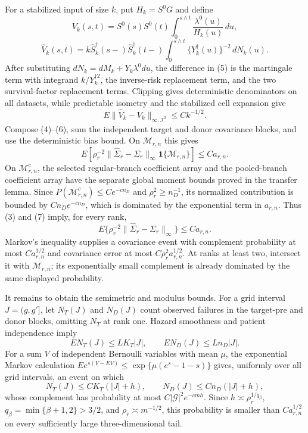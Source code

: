 For a stabilized input of size \(k\), put \(H_k=S^0G\) and define
\[
 V_k(s,t)=S^0(s)S^0(t)\int_0^{s\wedge t}
 \frac{\lambda^0(u)}{H_k(u)}\,du,
\]
\[
 \widehat V_k(s,t)=k\widehat S_k^\dagger(s-)
 \widehat S_k^\dagger(t-)
 \int_0^{s\wedge t}\{Y_k^\dagger(u)\}^{-2}\,dN_k(u). \tag{5}
\]
After substituting \(dN_k=dM_k+Y_k\lambda^0du\), the difference in (5) is
the martingale term with integrand \(k/Y_k^{\dagger2}\), the inverse-risk
replacement term, and the two survival-factor replacement terms.  Clipping
gives deterministic denominators on all datasets, while predictable isometry
and the stabilized cell expansion give
\[
 E\|\widehat V_k-V_k\|_{\infty,\mathcal I^2}
 \le Ck^{-1/2}.                                         \tag{6}
\]
Compose (4)--(6), sum the independent target and donor covariance blocks, and
use the deterministic bias bound.  On \(\mathcal M_{r,n}\) this gives
\[
 E\left[
 \rho_r^{-2}\|\widehat\Sigma_r-\Sigma_r\|_\infty
 \mathbf1\{\mathcal M_{r,n}\}\right]
 \le Ca_{r,n}.                                          \tag{7}
\]
On \(\mathcal M_{r,n}^c\), the selected regular-branch coefficient array and
the pooled-branch coefficient array have the separate global moment bounds
proved in the transfer lemma.  Since
\(P(\mathcal M_{r,n}^c)\le Ce^{-cn_D}\) and
\(\rho_r^2\ge n_D^{-1}\), its normalized contribution is bounded by
\(Cn_De^{-cn_D}\), which is dominated by the exponential term in
\(a_{r,n}\).  Thus (3) and (7) imply, for every rank,
\[
 E\{\rho_r^{-2}\|\widehat\Sigma_r-\Sigma_r\|_\infty\}
 \le Ca_{r,n}.                                          \tag{8}
\]
Markov's inequality supplies a covariance event with complement probability
at most \(Ca_{r,n}^{1/2}\) and covariance error at most
\(C\rho_r^2a_{r,n}^{1/2}\).  At ranks at least two, intersect it with
\(\mathcal M_{r,n}\); its exponentially small complement is already dominated
by the same displayed probability.

It remains to obtain the semimetric and modulus bounds.  For a grid interval
\(J=(g,g']\), let \(N_T(J)\) and \(N_D(J)\) count observed failures in the
target-pre and donor blocks, omitting \(N_T\) at rank one.  Hazard smoothness
and patient independence imply
\[
 EN_T(J)\le LK_T|J|,
 \qquad EN_D(J)\le Ln_D|J|.                             \tag{9}
\]
For a sum \(V\) of independent Bernoulli variables with mean \(\mu\), the
exponential Markov calculation
\(E e^{s(V-EV)}\le\exp\{\mu(e^s-1-s)\}\) gives, uniformly over all grid
intervals, an event on which
\[
 N_T(J)\le CK_T(|J|+h),
 \qquad N_D(J)\le Cn_D(|J|+h),                           \tag{10}
\]
whose complement has probability at most
\(C|\mathcal G|^2e^{-cmh}\).  Since
\(h\asymp\rho_r^{1/q_\beta}\),
\(q_\beta=\min\{\beta+1,2\}>3/2\), and
\(\rho_r\asymp m^{-1/2}\), this probability is smaller than
\(Ca_{r,n}^{1/2}\) on every sufficiently large three-dimensional tail.

